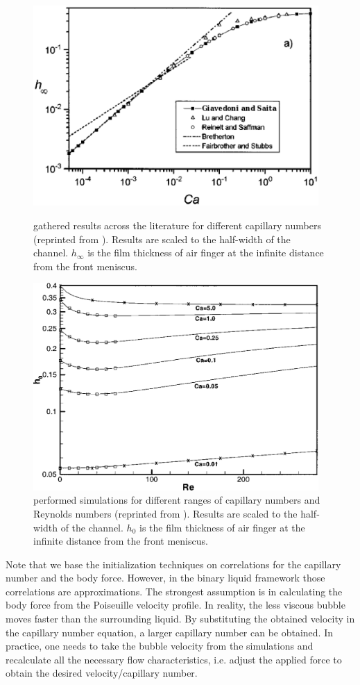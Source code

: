 \documentclass[preprint,12pt]{elsarticle}
\begin{document}
\begin{figure}
\includegraphics[width=0.97\textwidth]{Figures/giavedoni_planar.eps}
\caption{\citet{giavedoni-numerical} gathered results across the
literature for different capillary numbers (reprinted from \cite{giavedoni-numerical}). Results are
scaled to the half-width of the
channel. $h_{\infty}$ is the film thickness of air finger at
the infinite distance from the front meniscus. \label{fig:giavedoni:planar}}
\includegraphics[width=0.97\textwidth]{Figures/heil-planar.eps}
\caption{\citet{heil-bretherton} performed simulations for different ranges of
capillary numbers and Reynolds numbers (reprinted from \cite{heil-bretherton}). Results
are scaled to the half-width of the channel. $h_{0}$ is the film thickness of air finger at
the infinite distance from the front meniscus.
\label{fig:heil:planar}}
\end{figure}
Note that we base the initialization techniques on correlations for the
capillary number and the body force. However, in the binary liquid framework
those correlations are approximations. The strongest assumption is
in calculating the body force from the Poiseuille velocity profile.
In reality, the less viscous bubble moves faster than the surrounding liquid. By
substituting the obtained velocity in the capillary number equation, a
larger capillary number can be obtained. In practice, one needs to take the bubble velocity from the
simulations and
recalculate all the necessary flow characteristics, i.e. adjust the
 applied force to obtain the desired velocity/capillary number.
\end{document}
